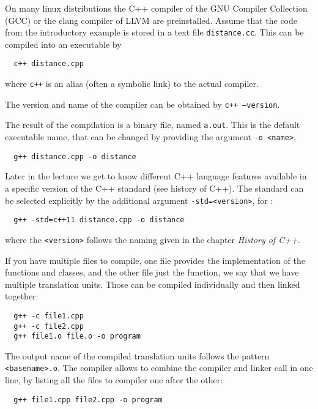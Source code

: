 On many linux distributions the C++ compiler of the GNU Compiler Collection (GCC) or the clang compiler of LLVM are preinstalled. Assume that the code from the introductory example is stored in a text file \texttt{distance.cc}. This can be compiled into an executable by
%
\begin{verbatim}
  c++ distance.cpp
\end{verbatim}
%
where \texttt{c++} is an alias (often a symbolic link) to the actual compiler.

\begin{rem}
  The version and name of the compiler can be obtained by \texttt{c++ --version}.
\end{rem}

The result of the compilation is a binary file, named \texttt{a.out}. This is the default executable name, that can be changed by providing the argument \texttt{-o <name>}, \eg
%
\begin{verbatim}
  g++ distance.cpp -o distance
\end{verbatim}
%
Later in the lecture we get to know different C++ language features available in a specific version of the C++ standard (see history of C++). The standard can be selected explicitly by the additional argument \texttt{-std=<version>}, \eg for :
%
\begin{verbatim}
  g++ -std=c++11 distance.cpp -o distance
\end{verbatim}
%
where the \texttt{<version>} follows the naming given in the chapter \emph{History of C++}.

If you have multiple files to compile, \eg one file provides the implementation of the functions and classes, and the other file just the  function, we say that we have multiple translation units. Those can be compiled individually and then linked together:
%
\begin{verbatim}
  g++ -c file1.cpp
  g++ -c file2.cpp
  g++ file1.o file.o -o program
\end{verbatim}
%
The output name of the compiled translation units follows the pattern \texttt{<basename>.o}. The compiler allows to combine the compiler and linker call in one line, by listing all the files to compiler one after the other:
%
\begin{verbatim}
  g++ file1.cpp file2.cpp -o program
\end{verbatim}

